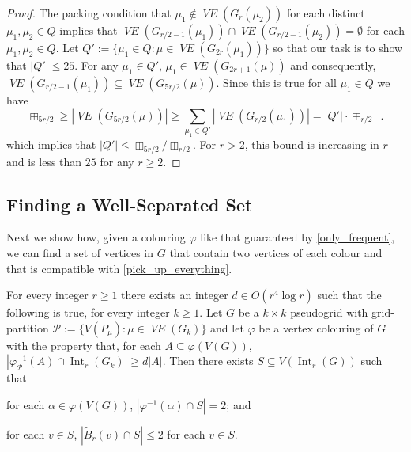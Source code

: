 \documentclass{patmorin}
\newcommand{\vol}[1]{\boxplus_{#1}}
\DeclareMathOperator{\interior}{Int}
\DeclareMathOperator{\VE}{\mathit{VE}}
\begin{document}
\begin{proof}
  The packing condition that $\mu_1\not\in \VE(G_r(\mu_2))$ for each distinct $\mu_1,\mu_2\in Q$ implies that $\VE(G_{r/2-1}(\mu_1))\cap \VE(G_{r/2-1}(\mu_2))=\emptyset$ for each $\mu_1,\mu_2\in Q$.  Let $Q':=\{\mu_1\in Q: \mu\in \VE(G_{2r}(\mu_1))\}$ so that our task is to show that $|Q'|\le 25$.  For any $\mu_1\in Q'$,
  $\mu_1\in\VE(G_{2r+1}(\mu))$ and consequently, $\VE(G_{r/2-1}(\mu_1))\subseteq \VE(G_{5r/2}(\mu))$.
  Since this is true for all $\mu_1\in Q$ we have
  \[  \vol{5r/2} \ge |\VE(G_{5r/2}(\mu))| \ge \sum_{\mu_1\in Q'} |\VE(G_{r/2}(\mu_1))|
  = |Q'|\cdot \vol{r/2} \enspace .
  \]
  which implies that $|Q'|\le \vol{5r/2}/\vol{r/2}$.  For $r > 2$, this bound is increasing in $r$ and is less than $25$ for any $r\ge 2$.
\end{proof}


\subsection{Finding a Well-Separated Set}
\label{well_separated}

Next we show how, given a colouring $\varphi$ like that guaranteed by \cref{only_frequent}, we can find a set of vertices in $G$ that contain two vertices of each colour and that is compatible with \cref{pick_up_everything}.

\begin{lem}\label{doubled_colour_set}
  For every integer $r\ge 1$ there exists an integer $d\in O(r^4\log r)$ such that the following is true, for every integer $k\ge 1$.\newline
  Let $G$ be a $k\times k$ pseudogrid with grid-partition $\mathcal{P}:=\{V(P_\mu):\mu\in\VE(G_k)\}$ and let $\varphi$ be a vertex colouring of $G$ with the property that, for each $A\subseteq\varphi(V(G))$, $|\varphi_{\mathcal{P}}^{-1}(A)\cap\interior_r(G_k)|\ge d|A|$.
  Then there exists $S\subseteq V(\interior_r(G))$ such that
  \begin{compactenum}[(i)]
    \item \label{hits_both} for each $\alpha\in\varphi(V(G))$, $|\varphi^{-1}(\alpha)\cap S|= 2$; and
    \item \label{spread_out} for each $v\in S$, $|\tilde{B}_r(v)\cap S|\le 2$ for each $v\in S$.
  \end{compactenum}
\end{lem}
\end{document}
